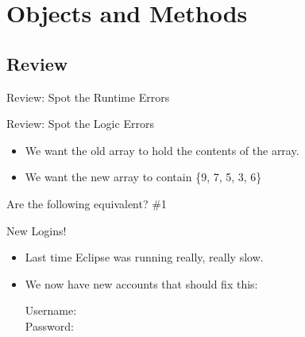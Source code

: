 
\section{Objects and Methods}
\subsection{Review}
\begin{frame}[fragile]{Review: Spot the Runtime Errors}
\begin{semiverbatim}\end{semiverbatim}
\end{frame}


\begin{frame}[fragile]{Review: Spot the Logic Errors}
\begin{itemize}
\item We want the old array to hold the contents of the array.
\item We want the new array to contain \{9, 7, 5, 3, 6\}
\end{itemize}
\begin{semiverbatim}\end{semiverbatim}
\end{frame}


\begin{frame}[fragile]{Are the following equivalent? \#1}
\begin{semiverbatim}\end{semiverbatim}
\end{frame}

\begin{frame}{New Logins!}
\begin{itemize}
\item Last time Eclipse was running really, really slow.
\item We now have new accounts that should fix this:

\begin{center}
Username: \\
Password: 
\end{center}

\end{itemize}
\end{frame}

